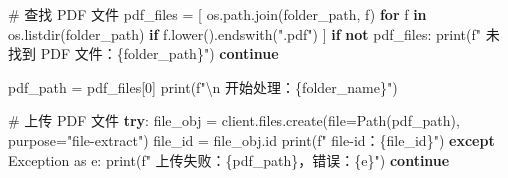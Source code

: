 \documentclass[
  letterpaper,
  DIV=11,
  numbers=noendperiod]{scrreprt}
\newenvironment{Shaded}{\begin{snugshade}}{\end{snugshade}}
\newcommand{\BuiltInTok}[1]{\textcolor[rgb]{0.00,0.23,0.31}{#1}}
\newcommand{\CharTok}[1]{\textcolor[rgb]{0.13,0.47,0.30}{#1}}
\newcommand{\CommentTok}[1]{\textcolor[rgb]{0.37,0.37,0.37}{#1}}
\newcommand{\ControlFlowTok}[1]{\textcolor[rgb]{0.00,0.23,0.31}{\textbf{#1}}}
\newcommand{\DecValTok}[1]{\textcolor[rgb]{0.68,0.00,0.00}{#1}}
\newcommand{\ImportTok}[1]{\textcolor[rgb]{0.00,0.46,0.62}{#1}}
\newcommand{\KeywordTok}[1]{\textcolor[rgb]{0.00,0.23,0.31}{\textbf{#1}}}
\newcommand{\NormalTok}[1]{\textcolor[rgb]{0.00,0.23,0.31}{#1}}
\newcommand{\OperatorTok}[1]{\textcolor[rgb]{0.37,0.37,0.37}{#1}}
\newcommand{\PreprocessorTok}[1]{\textcolor[rgb]{0.68,0.00,0.00}{#1}}
\newcommand{\SpecialCharTok}[1]{\textcolor[rgb]{0.37,0.37,0.37}{#1}}
\newcommand{\SpecialStringTok}[1]{\textcolor[rgb]{0.13,0.47,0.30}{#1}}
\newcommand{\StringTok}[1]{\textcolor[rgb]{0.13,0.47,0.30}{#1}}
\begin{document}
\begin{Shaded}
\begin{Highlighting}[]
            \CommentTok{\# 查找 PDF 文件}
\NormalTok{            pdf\_files }\OperatorTok{=}\NormalTok{ [}
\NormalTok{                os.path.join(folder\_path, f)}
                \ControlFlowTok{for}\NormalTok{ f }\KeywordTok{in}\NormalTok{ os.listdir(folder\_path)}
                \ControlFlowTok{if}\NormalTok{ f.lower().endswith(}\StringTok{".pdf"}\NormalTok{)}
\NormalTok{            ]}
            \ControlFlowTok{if} \KeywordTok{not}\NormalTok{ pdf\_files:}
                \BuiltInTok{print}\NormalTok{(}\SpecialStringTok{f" 未找到 PDF 文件：}\SpecialCharTok{\{}\NormalTok{folder\_path}\SpecialCharTok{\}}\SpecialStringTok{"}\NormalTok{)}
                \ControlFlowTok{continue}

\NormalTok{            pdf\_path }\OperatorTok{=}\NormalTok{ pdf\_files[}\DecValTok{0}\NormalTok{]}
            \BuiltInTok{print}\NormalTok{(}\SpecialStringTok{f"}\CharTok{\textbackslash{}n}\SpecialStringTok{ 开始处理：}\SpecialCharTok{\{}\NormalTok{folder\_name}\SpecialCharTok{\}}\SpecialStringTok{"}\NormalTok{)}

            \CommentTok{\# 上传 PDF 文件}
            \ControlFlowTok{try}\NormalTok{:}
\NormalTok{                file\_obj }\OperatorTok{=}\NormalTok{ client.files.create(}\BuiltInTok{file}\OperatorTok{=}\NormalTok{Path(pdf\_path), purpose}\OperatorTok{=}\StringTok{"file{-}extract"}\NormalTok{)}
\NormalTok{                file\_id }\OperatorTok{=}\NormalTok{ file\_obj.}\BuiltInTok{id}
                \BuiltInTok{print}\NormalTok{(}\SpecialStringTok{f" file{-}id：}\SpecialCharTok{\{}\NormalTok{file\_id}\SpecialCharTok{\}}\SpecialStringTok{"}\NormalTok{)}
            \ControlFlowTok{except} \PreprocessorTok{Exception} \ImportTok{as}\NormalTok{ e:}
                \BuiltInTok{print}\NormalTok{(}\SpecialStringTok{f" 上传失败：}\SpecialCharTok{\{}\NormalTok{pdf\_path}\SpecialCharTok{\}}\SpecialStringTok{，错误：}\SpecialCharTok{\{}\NormalTok{e}\SpecialCharTok{\}}\SpecialStringTok{"}\NormalTok{)}
                \ControlFlowTok{continue}


\end{Highlighting}
\end{Shaded}
\end{document}
